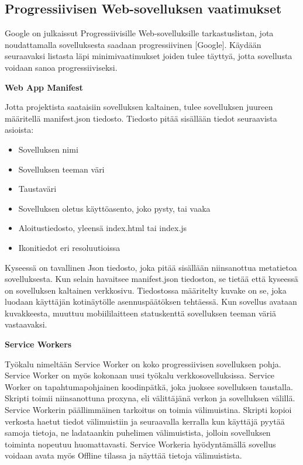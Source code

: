 \documentclass{tktltiki}
\begin{document}
\subsection{Progressiivisen Web-sovelluksen vaatimukset}

Google on julkaissut Progressiivisille Web-sovelluksille tarkastuslistan, jota noudattamalla sovelluksesta saadaan progressiivinen [Google]. Käydään seuraavaksi listasta läpi minimivaatimukset joiden tulee täyttyä, jotta sovellusta voidaan sanoa progressiiviseksi.

\textbf{Web App Manifest}

Jotta projektista saataisiin sovelluksen kaltainen, tulee sovelluksen juureen määritellä manifest.json tiedosto. Tiedosto pitää sisällään tiedot seuraavista asioista:

\begin{itemize}
  \item Sovelluksen nimi
  \item Sovelluksen teeman väri
  \item Taustaväri
  \item Sovelluksen oletus käyttöasento, joko pysty, tai vaaka
  \item Aloitustiedosto, yleensä index.html tai index.js
  \item Ikonitiedot eri resoluutioissa
\end{itemize}

Kyseessä on tavallinen Json tiedosto, joka pitää sisällään niinsanottua metatietoa sovelluksesta. Kun selain havaitsee manifest.json tiedoston, se tietää että kyseessä on sovelluksen kaltainen verkkosivu. Tiedostossa määritelty kuvake on se, joka luodaan käyttäjän kotinäytölle asennuspäätöksen tehtäessä. Kun sovellus avataan kuvakkeesta, muuttuu mobiililaitteen statuskenttä sovelluksen teeman väriä vastaavaksi.  

\textbf{Service Workers}

Työkalu nimeltään Service Worker on koko progressiivisen sovelluksen pohja. Service Worker on myös kokonaan uusi työkalu verkkosovelluksissa. Service Worker on tapahtumapohjainen koodinpätkä, joka juoksee sovelluksen taustalla. Skripti toimii niinsanottuna proxyna, eli välittäjänä verkon ja sovelluksen välillä. Service Workerin päällimmäinen tarkoitus on toimia välimuistina. Skripti kopioi verkosta haetut tiedot välimuistiin ja seuraavalla kerralla kun käyttäjä pyytää samoja tietoja, ne ladataankin puhelimen välimuistista, jolloin sovelluksen toiminta nopeutuu huomattavasti. Service Workeria hyödyntämällä sovellus voidaan avata myös Offline tilassa ja näyttää tietoja välimuistista. 
\end{document}
